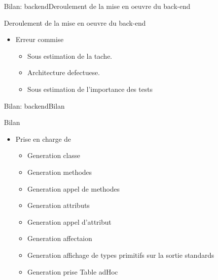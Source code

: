     \begin{frame}{Bilan: backend}{Deroulement de la mise en oeuvre du back-end}
    	\begin{block}{Deroulement de la mise en oeuvre du back-end}
	    	\begin{itemize}
	    		\item<1-> Erreur commise
	    		\begin{itemize}
					\item<2-> Sous estimation de la tache.
					\item<3-> Architecture defectuese.
					\item<4-> Sous estimation de l'importance des tests
	    		\end{itemize}
	    	\end{itemize}
	    \end{block}
    \end{frame}


    \begin{frame}{Bilan: backend}{Bilan}
    	\begin{block}{Bilan}
	    	\begin{itemize}
	    		\item<1-> Prise en charge de 
	    		\begin{itemize}
					\item<2-> Generation classe
					\item<3-> Generation methodes
					\item<4-> Generation appel de methodes
					\item<5-> Generation attributs
					\item<6-> Generation appel d'attribut
					\item<7-> Generation affectaion
					\item<8-> Generation affichage de types primitifs sur la sortie standards
					\item<9-> Generation prise Table adHoc
	    			
	    		\end{itemize}
	    	\end{itemize}
	    \end{block}
	\end{frame}

